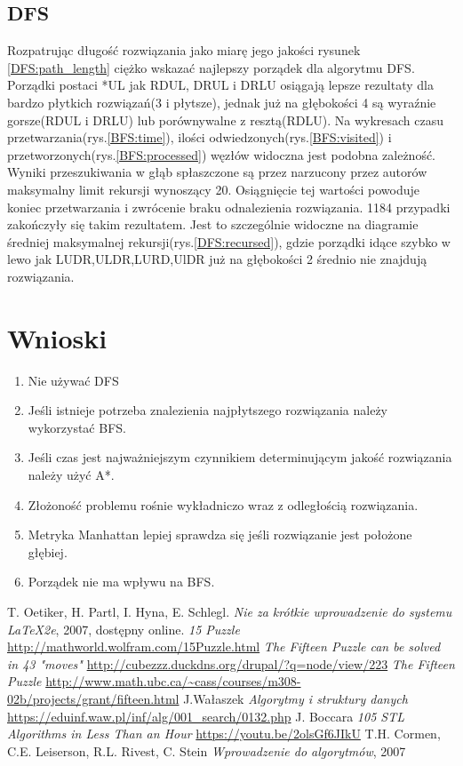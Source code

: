\documentclass{classrep}
\begin{document}
\subsection{DFS}

Rozpatrując długość rozwiązania jako miarę jego jakości rysunek \ref{DFS:path_length} ciężko wskazać najlepszy porządek dla algorytmu DFS.
Porządki postaci *UL jak RDUL, DRUL i DRLU osiągają lepsze rezultaty dla bardzo płytkich rozwiązań(3 i płytsze), jednak już na głębokości 4 są wyraźnie gorsze(RDUL i DRLU) lub porównywalne z resztą(RDLU).
Na wykresach czasu przetwarzania(rys.\ref{BFS:time}), ilości odwiedzonych(rys.\ref{BFS:visited}) i przetworzonych(rys.\ref{BFS:processed}) węzłów widoczna jest podobna zależność.
Wyniki przeszukiwania w głąb spłaszczone są przez narzucony przez autorów maksymalny limit rekursji wynoszący 20.
Osiągnięcie tej wartości powoduje koniec przetwarzania i zwrócenie braku odnalezienia rozwiązania.
1184 przypadki zakończyły się takim rezultatem.
Jest to szczególnie widoczne na diagramie średniej maksymalnej rekursji(rys.\ref{DFS:recursed}), gdzie porządki idące szybko w lewo jak LUDR,ULDR,LURD,UlDR już na głębokości 2 średnio nie znajdują rozwiązania.

 


\section{Wnioski}
\begin{enumerate}
    \item Nie używać DFS
    \item Jeśli istnieje potrzeba znalezienia najpłytszego rozwiązania należy wykorzystać BFS.
    \item Jeśli czas jest najważniejszym czynnikiem determinującym jakość rozwiązania należy użyć A*.
    \item Złożoność problemu rośnie wykładniczo wraz z odległością rozwiązania.
    \item Metryka Manhattan lepiej sprawdza się jeśli rozwiązanie jest położone głębiej.
    \item Porządek nie ma wpływu na BFS.
\end{enumerate}

\begin{thebibliography}{0}
   T. Oetiker, H. Partl, I. Hyna, E. Schlegl.
    \textsl{Nie za krótkie wprowadzenie do systemu \LaTeX2e}, 2007, dostępny
    online.
   \textsl{15 Puzzle} \url{http://mathworld.wolfram.com/15Puzzle.html}
   \textsl{The Fifteen Puzzle can be solved in 43 "moves"} \url{http://cubezzz.duckdns.org/drupal/?q=node/view/223}
   \textsl{The Fifteen Puzzle} \url{http://www.math.ubc.ca/~cass/courses/m308-02b/projects/grant/fifteen.html}
    J.Wałaszek \textsl{Algorytmy i struktury danych}
   \url{https://eduinf.waw.pl/inf/alg/001_search/0132.php}
    J. Boccara \textsl{105 STL Algorithms in Less Than an Hour} 
   \url{https://youtu.be/2olsGf6JIkU}
    T.H. Cormen, C.E. Leiserson, R.L. Rivest, C. Stein \textsl{Wprowadzenie do algorytmów}, 2007
\end{thebibliography}
\end{document}
